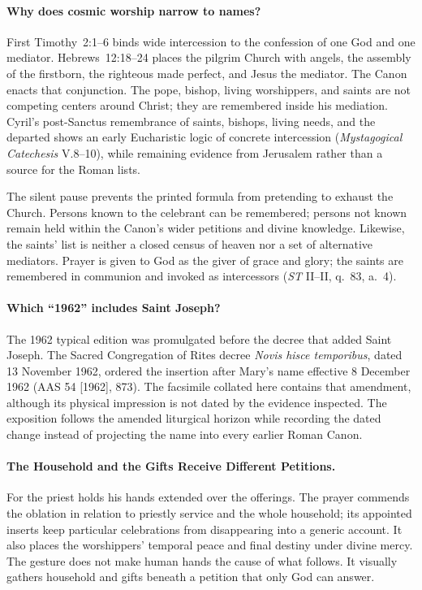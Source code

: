 \paragraph{Why does cosmic worship narrow to names?}
First Timothy~2:1--6 binds wide intercession to the confession of one God and one mediator. Hebrews~12:18--24 places the pilgrim Church with angels, the assembly of the firstborn, the righteous made perfect, and Jesus the mediator. The Canon enacts that conjunction. The pope, bishop, living worshippers, and saints are not competing centers around Christ; they are remembered inside his mediation. Cyril's post-Sanctus remembrance of saints, bishops, living needs, and the departed shows an early Eucharistic logic of concrete intercession (\emph{Mystagogical Catechesis} V.8--10), while remaining evidence from Jerusalem rather than a source for the Roman lists.

The silent pause prevents the printed formula from pretending to exhaust the Church. Persons known to the celebrant can be remembered; persons not known remain held within the Canon's wider petitions and divine knowledge. Likewise, the saints' list is neither a closed census of heaven nor a set of alternative mediators. Prayer is given to God as the giver of grace and glory; the saints are remembered in communion and invoked as intercessors (\emph{ST} II--II, q.~83, a.~4).

\paragraph{Which ``1962'' includes Saint Joseph?}
The 1962 typical edition was promulgated before the decree that added Saint Joseph. The Sacred Congregation of Rites decree \emph{Novis hisce temporibus}, dated 13 November 1962, ordered the insertion after Mary's name effective 8 December 1962 (AAS 54 [1962], 873). The facsimile collated here contains that amendment, although its physical impression is not dated by the evidence inspected. The exposition follows the amended liturgical horizon while recording the dated change instead of projecting the name into every earlier Roman Canon.

\paragraph{The Household and the Gifts Receive Different Petitions.}

For  the priest holds his hands extended over the offerings. The prayer commends the oblation in relation to priestly service and the whole household; its appointed inserts keep particular celebrations from disappearing into a generic account. It also places the worshippers' temporal peace and final destiny under divine mercy. The gesture does not make human hands the cause of what follows. It visually gathers household and gifts beneath a petition that only God can answer.

